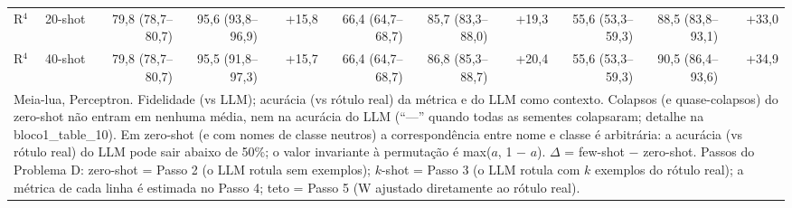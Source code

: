 \begin{table}[htbp]
\begin{tabular}{llrrrrrrrrr}
R$^4$ & 20-shot & 79,8 (78,7–80,7) & 95,6 (93,8–96,9) & +15,8 & 66,4 (64,7–68,7) & 85,7 (83,3–88,0) & +19,3 & 55,6 (53,3–59,3) & 88,5 (83,8–93,1) & +33,0 \\
R$^4$ & 40-shot & 79,8 (78,7–80,7) & 95,5 (91,8–97,3) & +15,7 & 66,4 (64,7–68,7) & 86,8 (85,3–88,7) & +20,4 & 55,6 (53,3–59,3) & 90,5 (86,4–93,6) & +34,9 \\
\bottomrule
\multicolumn{11}{p{0.95\linewidth}}{\footnotesize Meia-lua, Perceptron. Fidelidade (vs LLM); acurácia (vs rótulo real) da métrica e do LLM como contexto. Colapsos (e quase-colapsos) do zero-shot não entram em nenhuma média, nem na acurácia do LLM (``—'' quando todas as sementes colapsaram; detalhe na bloco1\_table\_10). Em zero-shot (e com nomes de classe neutros) a correspondência entre nome e classe é arbitrária: a acurácia (vs rótulo real) do LLM pode sair abaixo de 50\%; o valor invariante à permutação é max($a$, 1 $-$ $a$). $\Delta$ = few-shot $-$ zero-shot. Passos do Problema D: zero-shot = Passo 2 (o LLM rotula sem exemplos); $k$-shot = Passo 3 (o LLM rotula com $k$ exemplos do rótulo real); a métrica de cada linha é estimada no Passo 4; teto = Passo 5 (W ajustado diretamente ao rótulo real).} \\
\end{tabular}
\end{table}
